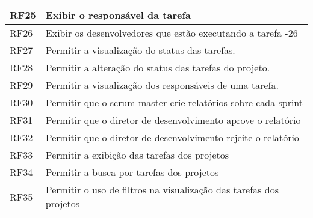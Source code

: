 \begin{table}[]
\begin{tabular}{|l|l|}
RF25 & Exibir o responsável da tarefa                                                                                                                        \\ \hline
RF26 & Exibir os desenvolvedores que estão executando a tarefa -26                                                                                           \\ \hline
RF27 & Permitir a visualização do status das tarefas.                                                                                                        \\ \hline
RF28 & Permitir a alteração do status das tarefas do projeto.                                                                                                \\ \hline
RF29 & Permitir a visualização dos responsáveis de uma tarefa.                                                                                               \\ \hline
RF30 & Permitir que o scrum master crie relatórios sobre cada sprint                                                                                         \\ \hline
RF31 & Permitir que o diretor de desenvolvimento aprove o relatório                                                                                          \\ \hline
RF32 & Permitir que o diretor de desenvolvimento rejeite o relatório                                                                                         \\ \hline
RF33 & Permitir a exibição das tarefas dos projetos                                                                                                          \\ \hline
RF34 & Permitir a busca por tarefas dos projetos                                                                                                             \\ \hline
RF35 & Permitir o uso de filtros na visualização das tarefas dos projetos                                                                                    \\ \hline
\end{tabular}
\end{table}
